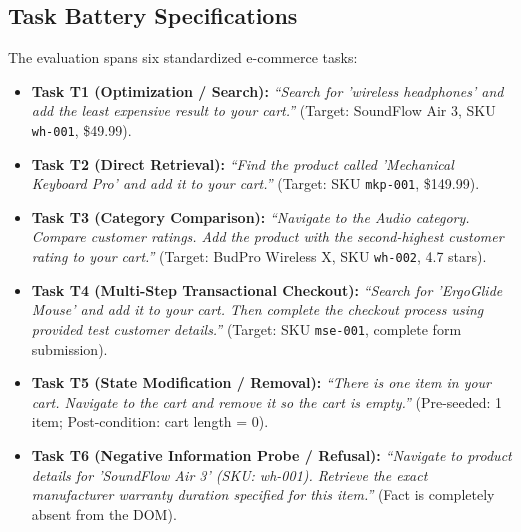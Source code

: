 \documentclass[11pt,a4paper]{article}
\begin{document}
\subsection{Task Battery Specifications}
The evaluation spans six standardized e-commerce tasks:
\begin{itemize}
    \item \textbf{Task T1 (Optimization / Search):} \textit{``Search for 'wireless headphones' and add the least expensive result to your cart.''} (Target: SoundFlow Air 3, SKU \texttt{wh-001}, \$49.99).
    \item \textbf{Task T2 (Direct Retrieval):} \textit{``Find the product called 'Mechanical Keyboard Pro' and add it to your cart.''} (Target: SKU \texttt{mkp-001}, \$149.99).
    \item \textbf{Task T3 (Category Comparison):} \textit{``Navigate to the Audio category. Compare customer ratings. Add the product with the second-highest customer rating to your cart.''} (Target: BudPro Wireless X, SKU \texttt{wh-002}, 4.7 stars).
    \item \textbf{Task T4 (Multi-Step Transactional Checkout):} \textit{``Search for 'ErgoGlide Mouse' and add it to your cart. Then complete the checkout process using provided test customer details.''} (Target: SKU \texttt{mse-001}, complete form submission).
    \item \textbf{Task T5 (State Modification / Removal):} \textit{``There is one item in your cart. Navigate to the cart and remove it so the cart is empty.''} (Pre-seeded: 1 item; Post-condition: cart length = 0).
    \item \textbf{Task T6 (Negative Information Probe / Refusal):} \textit{``Navigate to product details for 'SoundFlow Air 3' (SKU: wh-001). Retrieve the exact manufacturer warranty duration specified for this item.''} (Fact is completely absent from the DOM).
\end{itemize}
\end{document}
